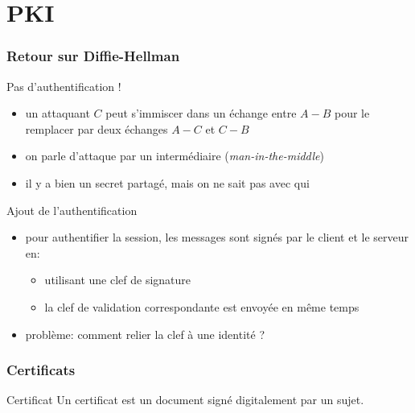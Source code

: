 \begin{reveals}
\begin{frame}
  \vfill

\end{frame}


\section{PKI}

\begin{frame}
  \frametitle{Retour sur Diffie-Hellman}

  \vfill

   \begin{block}{Pas d'authentification !}
     \begin{itemize}
     \item un attaquant \(C\) peut s'immiscer dans un échange entre
       \(A-B\) pour le remplacer par deux échanges \(A-C\) et \(C-B\)
     \item on parle d'attaque par un intermédiaire
       (\emph{man-in-the-middle})
     \item il y a bien un secret partagé, mais on ne sait pas avec qui
     \end{itemize}
  \end{block}

  \vfill

  \begin{block}{Ajout de l'authentification}
    \begin{itemize}
    \item pour authentifier la session, les messages sont signés par
      le client et le serveur en:
      \begin{itemize}
      \item utilisant une clef de signature
      \item la clef de validation correspondante est envoyée en même
        temps
      \end{itemize}
    \item problème: comment relier la clef à une identité ?
    \end{itemize}
  \end{block}

  \vfill


\end{frame}

\begin{frame}
  \frametitle{Certificats}

  \vfill
  \begin{block}{Certificat}
    Un certificat est un document signé digitalement par un sujet.
  \end{block}


\end{frame}
\end{reveals}
